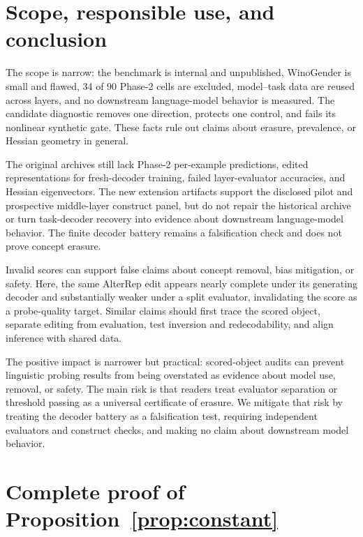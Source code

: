 \documentclass{article}
\begin{document}
\section{Scope, responsible use, and conclusion}

The scope is narrow: the benchmark is internal and unpublished, WinoGender is small and flawed, 34 of 90 Phase-2 cells are excluded, model--task data are reused across layers, and no downstream language-model behavior is measured. The candidate diagnostic removes one direction, protects one control, and fails its nonlinear synthetic gate. These facts rule out claims about erasure, prevalence, or Hessian geometry in general.

The original archives still lack Phase-2 per-example predictions, edited representations for fresh-decoder training, failed layer-evaluator accuracies, and Hessian eigenvectors. The new extension artifacts support the disclosed pilot and prospective middle-layer construct panel, but do not repair the historical archive or turn task-decoder recovery into evidence about downstream language-model behavior. The finite decoder battery remains a falsification check and does not prove concept erasure.

Invalid scores can support false claims about concept removal, bias mitigation, or safety. Here, the same AlterRep edit appears nearly complete under its generating decoder and substantially weaker under a split evaluator, invalidating the score as a probe-quality target. Similar claims should first trace the scored object, separate editing from evaluation, test inversion and redecodability, and align inference with shared data.

The positive impact is narrower but practical: scored-object audits can prevent linguistic probing results from being overstated as evidence about model use, removal, or safety. The main risk is that readers treat evaluator separation or threshold passing as a universal certificate of erasure. We mitigate that risk by treating the decoder battery as a falsification test, requiring independent evaluators and construct checks, and making no claim about downstream model behavior.

\clearpage



\clearpage
\appendix

\section{Complete proof of Proposition~\ref{prop:constant}}
\label{app:proof}
\end{document}
